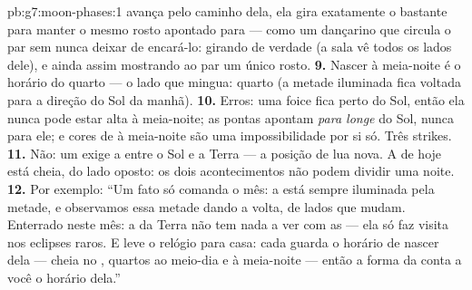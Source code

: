 \begin{solution}{pb:g7:moon-phases:1}
avança pelo caminho dela, ela gira exatamente o bastante para manter
o mesmo rosto apontado para  --- como um dançarino que circula o
par sem nunca deixar de encará-lo: girando de verdade (a sala vê
todos os lados dele), e ainda assim mostrando ao par um único rosto.
\textbf{9.} Nascer à meia-noite é o horário do quarto  --- o
lado que mingua: quarto  (a metade iluminada fica voltada
para a direção do Sol da manhã).
\textbf{10.} Erros: uma foice fica perto do Sol, então ela nunca pode
estar alta à meia-noite; as pontas apontam \emph{para longe} do Sol,
nunca para ele; e cores de  à meia-noite são uma
impossibilidade por si só. Três strikes.
\textbf{11.} Não: um  exige a  entre o Sol e a Terra
--- a posição de lua nova. A  de hoje está cheia, do lado oposto:
os dois acontecimentos não podem dividir uma noite.
\textbf{12.} Por exemplo: ``Um fato só comanda o mês: a  está
sempre iluminada pela metade, e  observamos essa metade dando a
volta, de lados que mudam. Enterrado neste mês: a  da Terra não
tem nada a ver com as  --- ela só faz visita nos eclipses raros.
E leve o relógio para casa: cada  guarda o horário de nascer dela
--- cheia no , quartos ao meio-dia e à meia-noite --- então
a forma da  conta a você o horário dela.''
\end{solution}
